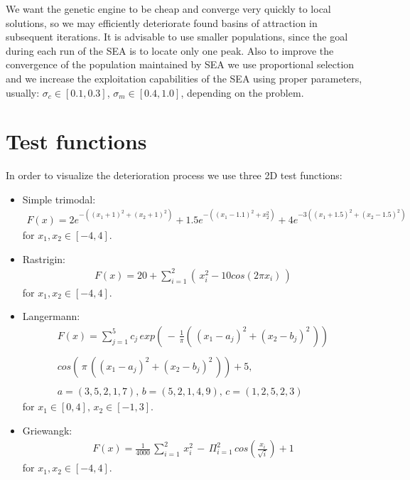 We want the genetic engine to be cheap and converge very quickly to local
solutions, so we may efficiently deteriorate found basins of attraction in 
subsequent iterations. It is advisable to use smaller populations, since the
goal during each run of the SEA is to locate only one peak. Also to improve the
convergence of the population maintained by SEA we use proportional selection and we increase the
exploitation capabilities of the SEA using proper parameters, usually:
$\sigma_c \in [0.1, 0.3]$, $\sigma_m \in [0.4, 1.0]$, depending on the problem.


\section{Test functions}
\label{sec:testFun}
In order to visualize the deterioration process we use 
three 2D test functions:
\begin{itemize}
  \item Simple trimodal:
  \begin{equation}
  \label{eqn:trimodal}
  \begin{array}{c}
  F(x)=2e^{-((x_1+1)^2+(x_2+1)^2)} + 1.5e^{-((x_1-1.1)^2+x_2^2)} +
  4e^{-3((x_1+1.5)^2+(x_2-1.5)^2)}
  \end{array}
  \end{equation}
  for $x_1, x_2 \in [-4, 4]$.
  \item Rastrigin: 
  \begin{equation}
  \label{eqn:Rastrigin}
  \begin{array}{c}
  F(x)= 20 + \sum_{i=1}^2 (\, x_i^2 - 10 cos(2 \pi x_i) \, )
  \end{array}
  \end{equation}
  for $x_1, x_2 \in [-4, 4]$.
  \item Langermann:
  \begin{equation}
  \label{eqn:Langermann}
  \begin{array}{c}
  F(x) = \sum_{j=1}^5 c_j \,
  exp(\, - \, \frac{1}{\pi}
  ( \, (x_1 - a_j)^2 + (x_2 - b_j)^2 \, ))\\ 
  \\
  cos(\, \pi \, ((x_1 - a_j)^2 + (x_2 - b_j)^2 \, )) + 5,\\ 
  \\ 
  a = (3,5,2,1,7), \, b = (5,2,1,4,9), \, c = (1,2,5,2,3)
  \end{array}
  \end{equation}
  for $x_1 \in [0, 4], \, x_2 \in [-1, 3]$.
  \item Griewangk:
  \begin{equation}
  \label{eqn:Gierwangk}
  \begin{array}{c}
  F(x)=\frac{1}{4000} \, \sum_{i=1}^2 \, x_i^2 \, - \, \Pi_{i=1}^2
  \, cos \left( \frac{x_i}{\sqrt{i}} \right) + 1
  \end{array}
  \end{equation}
  for $x_1, x_2 \in [-4, 4]$.
\end{itemize}

